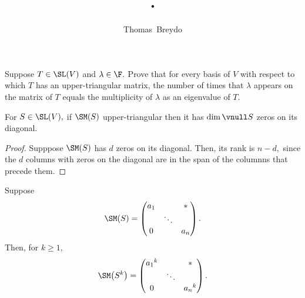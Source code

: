 \documentclass{amsart}
\title{\pagenum.\probnum}
\author{Thomas\ Breydo}
\begin{document}
\maketitle

\begin{problem*}
Suppose $T\in\SL(V)$ and $\lambda\in\F.$ Prove that for
every basis of $V$ with respect to which $T$ has
an upper-triangular matrix, the number of times
that $\lambda$ appears on the matrix of $T$ equals
the multiplicity of $\lambda$ as an eigenvalue
of $T.$
\end{problem*}

\vspace{0.5in}

\begin{claim}
For $S\in\SL(V),$ if $\SM(S)$ upper-triangular then it has
$\dim\vnull S$ zeros on its diagonal.
\end{claim}
\begin{proof}
Supppose $\SM(S)$ has $d$ zeros on its diagonal. Then, its
rank is $n-d,$ since the $d$ columns with zeros on the diagonal
are in the span of the columnns that precede them.
\end{proof}

\begin{claim}
Suppose
\begin{align*}
\SM(S)=\begin{pmatrix}
    a_1 & & * \\
        & \ddots &  \\
    0 & & a_n
\end{pmatrix}.
\end{align*}
Then, for $k\ge 1,$
\begin{align*}
    \SM\big(S^k\big)=\begin{pmatrix}
        {a_1}^k & & * \\
            & \ddots &  \\
        0 & & {a_n}^k
    \end{pmatrix}.
\end{align*}
\end{claim}
\end{document}
